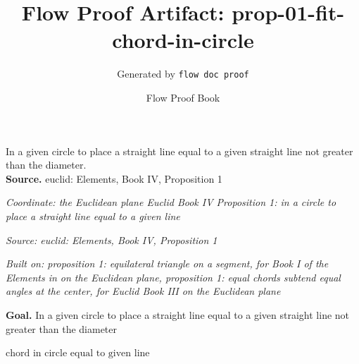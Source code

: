 \documentclass[11pt]{article}
\title{Flow Proof Artifact: prop-01-fit-chord-in-circle}
\author{Generated by \texttt{flow doc proof}}
\date{Flow Proof Book}
\theoremstyle{definition}
\begin{document}
\maketitle
In a given circle to place a straight line equal to a given straight line not greater than the diameter.\\[0.5em]
\textbf{Source.} euclid: Elements, Book IV, Proposition 1\\[0.5em]
\bigskip
{}\par
\smallskip\noindent\textit{Coordinate: the Euclidean plane \cdot Euclid Book IV \cdot Proposition 1: in a circle to place a straight line equal to a given line}\par
\smallskip\noindent\textit{Source: euclid: Elements, Book IV, Proposition 1}\par
\smallskip\noindent\textit{Built on: proposition 1: equilateral triangle on a segment, for Book I of the Elements in on the Euclidean plane, proposition 1: equal chords subtend equal angles at the center, for Euclid Book III on the Euclidean plane}\par
\medskip
\noindent\textbf{Goal.} In a given circle to place a straight line equal to a given straight line not greater than the diameter\par
\noindent$\displaystyle \text{chord in circle equal to given line}$\par
\medskip
\noindent
\end{document}
